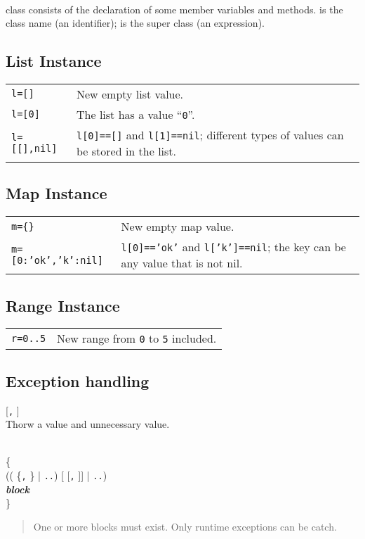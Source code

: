 \hangpar {} \\
class consists of the declaration of some member variables and methods.  is the class name (an identifier);  is the super class (an expression).

\subsection*{List Instance}
\begin{tabular}{@{}lp{}}
\texttt{l=[]} & New empty list value. \\
\texttt{l=[0]} & The list has a value ``\texttt{0}''. \\
\texttt{l=[[],nil]} & \texttt{l[0]==[]} and \texttt{l[1]==nil}; different types of values can be stored in the list. \\
\end{tabular}

\subsection*{Map Instance}
\begin{tabular}{@{}lp{}}
    \texttt{m=\{\}} & New empty map value. \\
    \texttt{m=[0:'ok','k':nil]} & \texttt{l[0]=='ok'} and \texttt{l['k']==nil}; the key can be any value that is not nil.\\
\end{tabular}


\subsection*{Range Instance}
\begin{tabular}{@{}lp{}}
    \texttt{r=0..5} & New range from \texttt{0} to \texttt{5} included. \\
\end{tabular}

\subsection*{Exception handling}
\hangpar {}  [\texttt{,} ]\\
Thorw a  value and unnecessary  value.

\noindent {}\\
\hphantom{m} \{\\
 (( \{\texttt{,} \} | \texttt{..}) [  [\texttt{,} ]] | \texttt{..}) \textit{\\
\hphantom{m}\textbf{block}}\\
\} 
\begin{quote}
    One or more  blocks must exist. Only runtime exceptions can be catch.
\end{quote}

